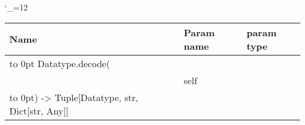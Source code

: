 \begingroup \catcode`\_=12 \tt
\begin{tabular}{lll}
\toprule
\textrm{Name}&\textrm{Param name}&\textrm{param type}\\
\midrule
\hbox to 0pt {Datatype.decode(\hss}\\
& self\\
\hbox to 0pt{) -> Tuple[Datatype, str, Dict[str, Any]]\hss}\\
\bottomrule
\end{tabular}
\endgroup
